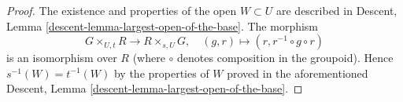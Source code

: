 \documentclass{stacks-project}
\theoremstyle{plain}
\theoremstyle{definition}
\theoremstyle{remark}
\numberwithin{equation}{subsection}
\begin{document}
\begin{proof}
The existence and properties of the open $W \subset U$ are described in
Descent, Lemma \ref{descent-lemma-largest-open-of-the-base}.
The morphism
$$
G \times_{U, t} R \longrightarrow R \times_{s, U} G, \quad
(g, r) \longmapsto (r, r^{-1} \circ g \circ r)
$$
is an isomorphism over $R$ (where $\circ$ denotes
composition in the groupoid). Hence $s^{-1}(W) = t^{-1}(W)$ by the
properties of $W$ proved in the aforementioned
Descent, Lemma \ref{descent-lemma-largest-open-of-the-base}.
\end{proof}
\end{document}
